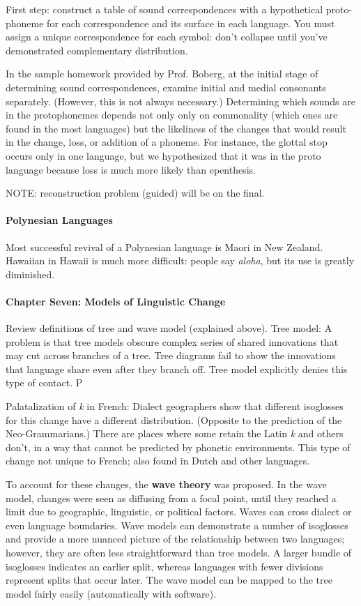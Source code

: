 \documentclass{exam}
\begin{document}
First step: construct a table of sound correspondences with a hypothetical proto-phoneme for each correspondence and its surface in each language. You must assign a unique correspondence for each symbol: don't collapse until you've demonstrated complementary distribution. 

In the sample homework provided by Prof. Boberg, at the initial stage of determining sound correspondences, examine initial and medial consonants separately. (However, this is not always necessary.) Determining which sounds are in the protophonemes depends not only only on commonality (which ones are found in the most languages) but the likeliness of the changes that would result in the change, loss, or addition of a phoneme. For instance, the glottal stop occurs only in one language, but we hypothesized that it was in the proto language because loss is much more likely than epenthesis. 

NOTE: reconstruction problem (guided) will be on the final.


\paragraph{Polynesian Languages} Most successful revival of a Polynesian language is Maori in New Zealand. Hawaiian in Hawaii is much more difficult: people say \textit{aloha}, but its use is greatly diminished. 


\paragraph{Chapter Seven: Models of Linguistic Change} Review definitions of tree and wave model (explained above). Tree model: A problem is that tree models obscure complex series of shared innovations that may cut across branches of a tree. Tree diagrams fail to show the innovations that language share even after they branch off. Tree model explicitly denies this type of contact. P

Palatalization of \textit{k} in French: Dialect geographers show that different isoglosses for this change have a different distribution. (Opposite to the prediction of the Neo-Grammarians.) There are places where some retain the Latin \textit{k} and others don't, in a way that cannot be predicted by phonetic environments. This type of change not unique to French; also found in Dutch and other languages. 

To account for these changes, the \textbf{wave theory }was proposed. In the wave model, changes were seen as diffusing from a focal point, until they reached a limit due to geographic, linguistic, or political factors. Waves can cross dialect or even language boundaries. Wave models can demonstrate a number of isoglosses and provide a more nuanced picture of the relationship between two languages; however, they are often less straightforward than tree models. A larger bundle of isoglosses indicates an earlier split, whereas languages with fewer divisions represent splits that occur later. The wave model can be mapped to the tree model fairly easily (automatically with software). 
\end{document}
